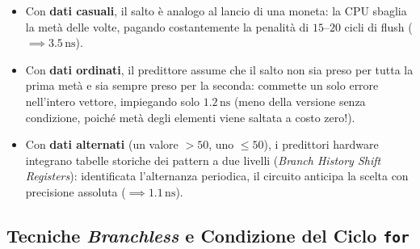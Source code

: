 \begin{table}[H]
\centering
\small
{}
\caption{Tempo medio per iterazione di \texttt{do\_more\_stuff\_5()} in funzione della predicibilit\`a dei dati~\cite{slotin2023}.}
\label{tab:branch-prediction-benchmark}
\end{table}

\begin{itemize}
    \item Con \textbf{dati casuali}, il salto \`e analogo al lancio di una moneta: la CPU sbaglia la met\`a delle volte, pagando costantemente la penalit\`a di $15\text{--}20$ cicli di flush ($\implies 3.5\,\text{ns}$).
    \item Con \textbf{dati ordinati}, il predittore assume che il salto non sia preso per tutta la prima met\`a e sia sempre preso per la seconda: commette un solo errore nell'intero vettore, impiegando solo $1.2\,\text{ns}$ (meno della versione senza condizione, poiché met\`a degli elementi viene saltata a costo zero!).
    \item Con \textbf{dati alternati} (un valore $>50$, uno $\le 50$), i predittori hardware integrano tabelle storiche dei pattern a due livelli (\textit{Branch History Shift Registers}): identificata l'alternanza periodica, il circuito anticipa la scelta con precisione assoluta ($\implies 1.1\,\text{ns}$).
\end{itemize}

\FloatBarrier
\subsection{Tecniche \textit{Branchless} e Condizione del Ciclo \texttt{for}}
\label{subsec:branchless-for}

